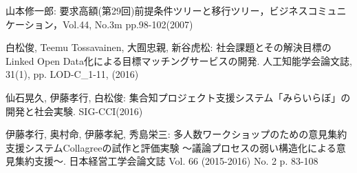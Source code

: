 
\begin{thebibliography}{99}

山本修一郎: 要求高額(第29回)前提条件ツリーと移行ツリー，ビジネスコミュニケーション，Vol.44, No.3m pp.98-102(2007)

白松俊, Teemu Tossavainen, 大囿忠親, 新谷虎松: 社会課題とその解決目標のLinked Open Data化による目標マッチングサービスの開発. 人工知能学会論文誌, 31(1), pp. LOD-C\_1-11, (2016)

仙石晃久, 伊藤孝行, 白松俊: 集合知プロジェクト支援システム「みらいらぼ」の開発と社会実験. SIG-CCI(2016)

伊藤孝行, 奥村命, 伊藤孝紀, 秀島栄三: 多人数ワークショップのための意見集約支援システムCollagreeの試作と評価実験 ～議論プロセスの弱い構造化による意見集約支援～. 日本経営工学会論文誌 Vol. 66 (2015-2016) No. 2 p. 83-108

\end{thebibliography}
